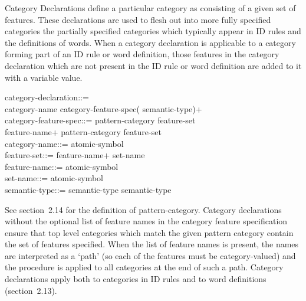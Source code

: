 Category Declarations define a
particular category as consisting of a given set of features. These
declarations are used to flesh out into more fully specified categories
the partially specified categories which typically appear in ID rules
and the definitions of words. When a category declaration is applicable
to a category forming part of an ID rule or word definition, those
features in the category declaration which are not present in the ID
rule or word definition are added to it with a variable value.
\begin{display}
\la category-declaration\ra ::=\\
\cont \la category-name\ra \lit{:} \la category-feature-spec\ra (\lit{:} \la semantic-type\ran)+ \\
\la category-feature-spec\ra ::= \la pattern-category\ra \lit{=\ran} \la feature-set\ra \alt\\
\cont \lit{(} \la feature-name\ran+ \lit{)} \la pattern-category\ra \lit{=\ran} \la feature-set\ra\\
\la category-name\ra ::= \la atomic-symbol\ra\\
\la feature-set\ra ::= \lit{\{} \la feature-name\ran+ \lit{\}} \alt \la set-name\ra\\
\la feature-name\ra ::= \la atomic-symbol\ra\\
\la set-name\ra ::= \la atomic-symbol\ra\\
\la semantic-type\ra ::=  \alt {} \alt \lit{*} \alt \lit{\la} \la semantic-type\ra \lit{,} \la semantic-type\ra \lit{\ran}
\end{display}
See section~2.14 for the definition of \la pattern-category\ran.  Category
declarations without the optional list of feature names in the category
feature specification ensure that top level categories which match the given
pattern category contain the set of features specified.
When the list of feature names is present, the names are interpreted as
a `path' (so each of the features must be category-valued) and the
procedure is applied to all categories at the end of such a path.
Category declarations apply both to categories in ID rules
and to word definitions (section~2.13).

